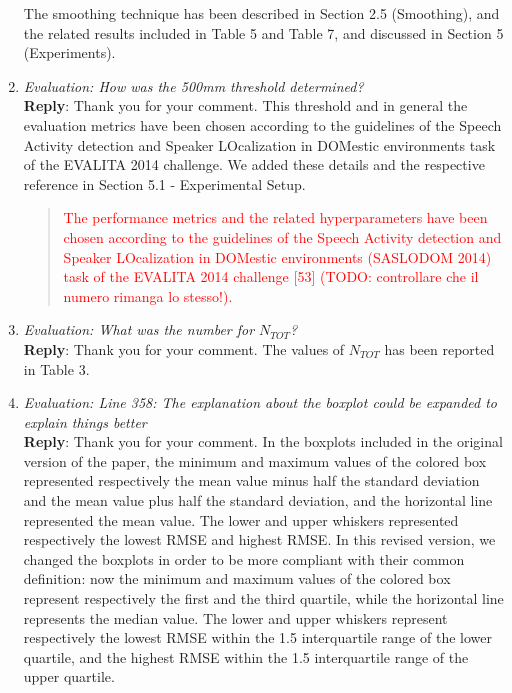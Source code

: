 \documentclass[11pt, technote, letterpaper, oneside, onecolumn]{IEEEtran}
\begin{document}
\begin{enumerate}
The smoothing technique has been described in Section 2.5 (Smoothing), and the related results included in Table 5 and Table 7, and discussed in Section 5 (Experiments).

\item \textit{Evaluation: How was the 500mm threshold determined?\\}
\textbf{Reply}: Thank you for your comment. This threshold and in general the evaluation metrics have been chosen according to the guidelines of the Speech Activity detection and Speaker LOcalization in DOMestic environments task of the EVALITA 2014 challenge. We added these details and the respective reference in Section 5.1 - Experimental Setup.
\begin{quote}
	\textcolor{red}{The performance metrics and the related hyperparameters have been chosen according to the guidelines of the Speech Activity detection and Speaker LOcalization in DOMestic environments (SASLODOM 2014) task of the EVALITA 2014 challenge [53] (TODO: controllare che il numero rimanga lo stesso!).}
\end{quote}

\item \textit{Evaluation: What was the number for $N_{TOT}$?\\}
\textbf{Reply}: Thank you for your comment. The values of $N_{TOT}$ has been reported in Table 3.

\item \textit{Evaluation: Line 358: The explanation about the boxplot could be expanded to explain things better\\}
\textbf{Reply}: Thank you for your comment. In the boxplots included in the original version of the paper,  the minimum and maximum values of the colored box represented respectively the mean value minus half the standard deviation and the mean value plus half the standard deviation, and the horizontal line represented the mean value. The lower and upper whiskers represented respectively the lowest RMSE and highest RMSE. In this revised version, we changed the boxplots in order to be more compliant with their common definition: now the minimum and maximum values of the colored box represent respectively the first and the third quartile, while the horizontal line represents the median value. The lower and upper whiskers represent respectively the lowest RMSE within the 1.5 interquartile range of the lower quartile, and the highest RMSE within the 1.5 interquartile range of the upper quartile.


\end{enumerate}
\end{document}
